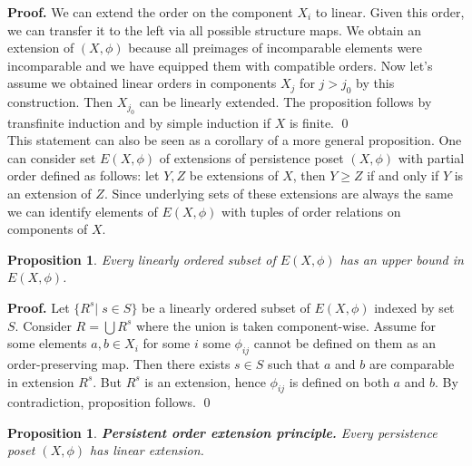 \documentclass[english,12pt]{article}
\newcounter{stmcounter}[section]
\numberwithin{equation}{section}
\newtheorem{proposition}[stmcounter]{Proposition}
\theoremstyle{definition}
\theoremstyle{remark}
\newenvironment{pf}{\noindent\textbf{Proof.}}{\qed}
\renewcommand{\geq}{\geqslant}
\begin{document}
\begin{pf}
  We can extend the order on the component $X_i$ to linear. Given this order, we can transfer it to the left via all possible structure maps. We obtain an extension of $(X,\phi)$ because all preimages of incomparable elements were incomparable and we have equipped them with compatible orders. Now let's assume we obtained linear orders in components $X_j$ for $j > j_0$ by this construction. Then $X_{j_0}$ can be linearly extended. The proposition follows by transfinite induction and by simple induction if $X$ is finite.
\end{pf}\\

This statement can also be seen as a corollary of a more general proposition.
One can consider set $E(X,\phi)$ of extensions of persistence poset $(X,\phi)$ with partial order defined as follows: let $Y, Z$ be extensions of $X$, then $Y \geq Z$ if and only if $Y$ is an extension of $Z$. Since underlying sets of these extensions are always the same we can identify elements of $E(X,\phi)$ with tuples of order relations on components of $X$.

\begin{proposition}
  Every linearly ordered subset of $E(X,\phi)$ has an upper bound in $E(X,\phi)$.
\end{proposition}

\begin{pf}
  Let $\{R^s|\;s \in S\}$ be a linearly ordered subset of $E(X,\phi)$ indexed by set $S$. Consider $R = \bigcup R^s$ where the union is taken component-wise. Assume for some elements $a, b \in X_i$ for some $i$ some $\phi_{ij}$ cannot be defined on them as an order-preserving map. Then there exists $s \in S$ such that $a$ and $b$ are comparable in extension $R^s$. But $R^s$ is an extension, hence $\phi_{ij}$ is defined on both $a$ and $b$. By contradiction, proposition follows.
\end{pf}

\begin{proposition}
  \textbf{Persistent order extension principle.} Every persistence poset $(X,\phi)$ has linear extension.
\end{proposition}
\end{document}
